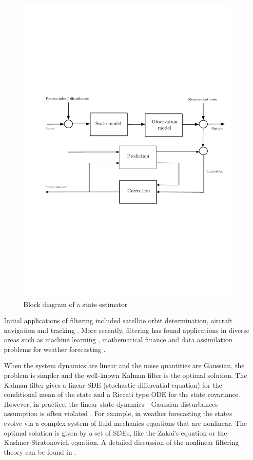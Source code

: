 \begin{figure}
	\centering
	\includegraphics[width=7in]{images/Chap1_state_est_block}
	\caption{Block diagram of a state estimator}
	\label{Fig:state_estimator}
\end{figure}
Initial applications of filtering included satellite orbit determination, aircraft navigation and tracking \cite{kutsurpfi19}. More recently, filtering has found applications in diverse areas such as machine learning \cite{bishop06}, mathematical finance \cite{brihan08} and data assimilation problems for weather forecasting \cite{eve94}. 

When the system dynamics are linear and the noise quantities are Gaussian, the problem is simpler and the well-known Kalman filter is the optimal solution. The Kalman filter gives a linear SDE (stochastic differential equation) for the conditional mean of the state and a Riccati type ODE for the state covariance. However, in practice, the linear state dynamics - Gaussian disturbances assumption is often violated . For example, in weather forecasting the states evolve via a complex system of fluid mechanics equations that are nonlinear. The optimal solution is given by a set of SDEs, like the Zakai's equation or the Kushner-Stratonovich equation. A detailed discussion of the nonlinear filtering theory can be found in \cite{baicri08}. 

